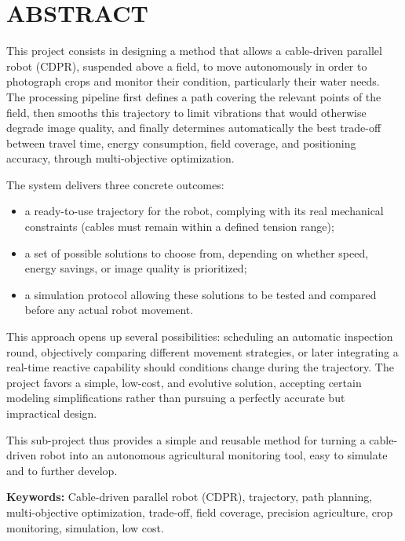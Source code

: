 \chapter*{ABSTRACT}
\thispagestyle{plain}
\setlength{\parskip}{0.55em}

This project consists in designing a method that allows a cable-driven parallel robot (CDPR), suspended above a field, to move autonomously in order to photograph crops and monitor their condition, particularly their water needs. The processing pipeline first defines a path covering the relevant points of the field, then smooths this trajectory to limit vibrations that would otherwise degrade image quality, and finally determines automatically the best trade-off between travel time, energy consumption, field coverage, and positioning accuracy, through multi-objective optimization.

The system delivers three concrete outcomes:
\begin{itemize}[itemsep=2pt]
  \item a ready-to-use trajectory for the robot, complying with its real mechanical constraints (cables must remain within a defined tension range);
  \item a set of possible solutions to choose from, depending on whether speed, energy savings, or image quality is prioritized;
  \item a simulation protocol allowing these solutions to be tested and compared before any actual robot movement.
\end{itemize}

This approach opens up several possibilities: scheduling an automatic inspection round, objectively comparing different movement strategies, or later integrating a real-time reactive capability should conditions change during the trajectory. The project favors a simple, low-cost, and evolutive solution, accepting certain modeling simplifications rather than pursuing a perfectly accurate but impractical design.

This sub-project thus provides a simple and reusable method for turning a cable-driven robot into an autonomous agricultural monitoring tool, easy to simulate and to further develop.

\vspace{0.4cm}
\textbf{Keywords:} Cable-driven parallel robot (CDPR), trajectory, path planning, multi-objective optimization, trade-off, field coverage, precision agriculture, crop monitoring, simulation, low cost.


\clearpage
